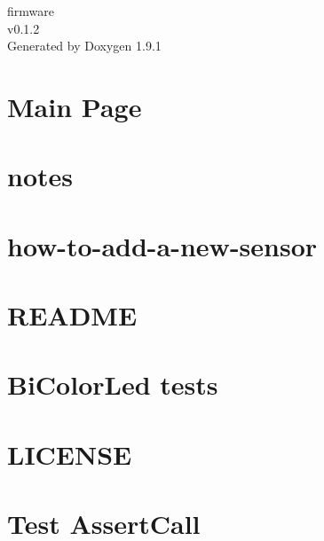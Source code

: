 \let\mypdfximage\pdfximage\def\pdfximage{\immediate\mypdfximage}\documentclass[twoside]{book}
\newcommand{\+}{\discretionary{\mbox{\scriptsize$\hookleftarrow$}}{}{}}
\newcommand{\clearemptydoublepage}{%
  \newpage{\pagestyle{empty}\cleardoublepage}%
}
\begin{document}
\raggedbottom

\hypersetup{pageanchor=false,
             bookmarksnumbered=true,
             pdfencoding=unicode
            }
\begin{titlepage}
\vspace*{7cm}
\begin{center}%
{\Large firmware \\[1ex]\large v0.\+1.\+2 }\\
\vspace*{1cm}
{\large Generated by Doxygen 1.9.1}\\
\end{center}
\end{titlepage}
\clearemptydoublepage
{}
\tableofcontents
\clearemptydoublepage
{}
\hypersetup{pageanchor=true}

\chapter{Main Page}
\label{index}\hypertarget{index}{}
\chapter{notes}
\label{md_cheatsheet}

\chapter{how-\/to-\/add-\/a-\/new-\/sensor}
\label{md_how_to_add_a_new_sensor}

\chapter{README}
\label{md_kits_README}

\chapter{Bi\+Color\+Led tests}
\label{md_lib_build_test_runner}

\chapter{LICENSE}
\label{md_LICENSE}

\chapter{Test Assert\+Call}
\label{md_mock_c_build_test_runner}

\end{document}
